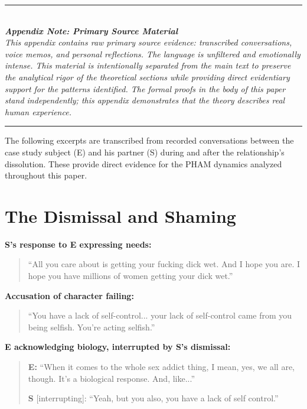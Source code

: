 \documentclass[12pt,openany]{book}
\numberwithin{equation}{chapter}
\begin{document}
\begin{center}
\rule{0.6\textwidth}{0.4pt}\\[0.5em]
\textit{\textbf{Appendix Note: Primary Source Material}}\\[0.3em]
\textit{This appendix contains raw primary source evidence: transcribed conversations, voice memos, and personal reflections. The language is unfiltered and emotionally intense. This material is intentionally separated from the main text to preserve the analytical rigor of the theoretical sections while providing direct evidentiary support for the patterns identified. The formal proofs in the body of this paper stand independently; this appendix demonstrates that the theory describes real human experience.}\\[0.5em]
\rule{0.6\textwidth}{0.4pt}
\end{center}

\vspace{1em}

The following excerpts are transcribed from recorded conversations between the case study subject (E) and his partner (S) during and after the relationship's dissolution. These provide direct evidence for the PHAM dynamics analyzed throughout this paper.

\section{The Dismissal and Shaming}

\textbf{S's response to E expressing needs:}
\begin{quote}
``All you care about is getting your fucking dick wet. And I hope you are. I hope you have millions of women getting your dick wet.''
\end{quote}

\textbf{Accusation of character failing:}
\begin{quote}
``You have a lack of self-control... your lack of self-control came from you being selfish. You're acting selfish.''
\end{quote}

\textbf{E acknowledging biology, interrupted by S's dismissal:}
\begin{quote}
\textbf{E:} ``When it comes to the whole sex addict thing, I mean, yes, we all are, though. It's a biological response. And, like...''

\textbf{S} [interrupting]: ``Yeah, but you also, you have a lack of self control.''
\end{quote}
\end{document}
